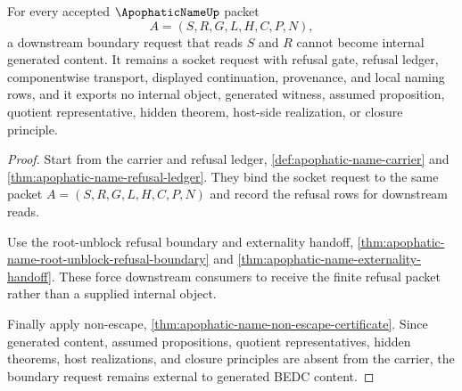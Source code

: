 \begin{theorem}
\label{thm:apophatic-name-boundary-request-nonescape}
For every accepted $\ApophaticNameUp$ packet
$$
A=(S,R,G,L,H,C,P,N),
$$
a downstream boundary request that reads $S$ and $R$ cannot become internal generated content. It remains a socket request with refusal gate, refusal ledger, componentwise transport, displayed continuation, provenance, and local naming rows, and it exports no internal object, generated witness, assumed proposition, quotient representative, hidden theorem, host-side realization, or closure principle.
\end{theorem}
\begin{proof}
Start from the carrier and refusal ledger, \autoref{def:apophatic-name-carrier} and \autoref{thm:apophatic-name-refusal-ledger}. They bind the socket request to the same packet $A=(S,R,G,L,H,C,P,N)$ and record the refusal rows for downstream reads.

Use the root-unblock refusal boundary and externality handoff, \autoref{thm:apophatic-name-root-unblock-refusal-boundary} and \autoref{thm:apophatic-name-externality-handoff}. These force downstream consumers to receive the finite refusal packet rather than a supplied internal object.

Finally apply non-escape, \autoref{thm:apophatic-name-non-escape-certificate}. Since generated content, assumed propositions, quotient representatives, hidden theorems, host realizations, and closure principles are absent from the carrier, the boundary request remains external to generated BEDC content.
\end{proof}

